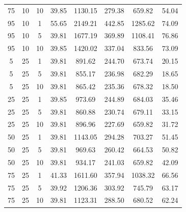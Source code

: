 \begin{table}[H]
\begin{tabular}{ccc|c|c|c|c|c}
75 & 10 & 10 & \cellcolor{gray!80}39.85 & \cellcolor{gray!13}1130.15 & \cellcolor{gray!1}279.38 & \cellcolor{gray!80}659.82 & 54.04\\
95 & 10 & 1 & \cellcolor{gray!1}55.65 & \cellcolor{gray!1}2149.21 & \cellcolor{gray!1}442.85 & \cellcolor{gray!1}1285.62 & 74.09\\
95 & 10 & 5 & \cellcolor{gray!80}39.81 & \cellcolor{gray!1}1677.19 & \cellcolor{gray!1}369.89 & \cellcolor{gray!1}1108.41 & 76.86\\
95 & 10 & 10 & \cellcolor{gray!80}39.85 & \cellcolor{gray!1}1420.02 & \cellcolor{gray!1}337.04 & \cellcolor{gray!27}833.56 & 73.09\\
5 & 25 & 1 & \cellcolor{gray!80}39.81 & \cellcolor{gray!53}891.62 & \cellcolor{gray!17}244.70 & \cellcolor{gray!76}673.74 & 20.15\\
5 & 25 & 5 & \cellcolor{gray!80}39.81 & \cellcolor{gray!59}855.17 & \cellcolor{gray!24}236.98 & \cellcolor{gray!74}682.29 & 18.65\\
5 & 25 & 10 & \cellcolor{gray!80}39.81 & \cellcolor{gray!57}865.42 & \cellcolor{gray!26}235.36 & \cellcolor{gray!75}678.32 & 18.50\\
25 & 25 & 1 & \cellcolor{gray!80}39.85 & \cellcolor{gray!39}973.69 & \cellcolor{gray!17}244.89 & \cellcolor{gray!73}684.03 & 35.46\\
25 & 25 & 5 & \cellcolor{gray!80}39.81 & \cellcolor{gray!58}860.88 & \cellcolor{gray!30}230.74 & \cellcolor{gray!75}679.11 & 33.15\\
25 & 25 & 10 & \cellcolor{gray!80}39.81 & \cellcolor{gray!52}896.96 & \cellcolor{gray!33}227.69 & \cellcolor{gray!80}659.82 & 31.72\\
50 & 25 & 1 & \cellcolor{gray!80}39.81 & \cellcolor{gray!11}1143.05 & \cellcolor{gray!1}294.28 & \cellcolor{gray!67}703.27 & 51.45\\
50 & 25 & 5 & \cellcolor{gray!80}39.81 & \cellcolor{gray!40}969.63 & \cellcolor{gray!2}260.42 & \cellcolor{gray!79}664.53 & 50.82\\
50 & 25 & 10 & \cellcolor{gray!80}39.81 & \cellcolor{gray!46}934.17 & \cellcolor{gray!20}241.03 & \cellcolor{gray!80}659.82 & 42.09\\
75 & 25 & 1 & \cellcolor{gray!65}41.33 & \cellcolor{gray!1}1611.60 & \cellcolor{gray!1}357.94 & \cellcolor{gray!1}1038.32 & 66.56\\
75 & 25 & 5 & \cellcolor{gray!79}39.92 & \cellcolor{gray!1}1206.36 & \cellcolor{gray!1}303.92 & \cellcolor{gray!54}745.79 & 63.17\\
75 & 25 & 10 & \cellcolor{gray!80}39.81 & \cellcolor{gray!14}1123.31 & \cellcolor{gray!1}288.50 & \cellcolor{gray!74}680.52 & 62.24\\

\end{tabular}
\end{table}
